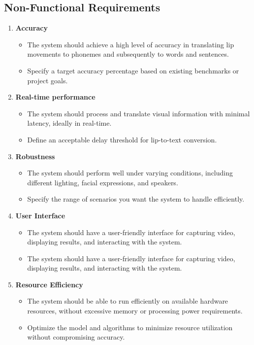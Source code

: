 \subsection{Non-Functional Requirements}
\begin{enumerate}
\item \textbf{Accuracy}
\begin{itemize}
\item The system should achieve a high level of accuracy in translating lip movements to phonemes and subsequently to words and sentences.  
\item Specify a target accuracy percentage based on existing benchmarks or project goals. 


\end{itemize}
\item \textbf{Real-time performance}
\begin{itemize}
\item The system should process and translate visual information with minimal latency, ideally in real-time.  
\item Define an acceptable delay threshold for lip-to-text conversion. 


\end{itemize}
\item \textbf{Robustness}
\begin{itemize}
\item The system should perform well under varying conditions, including different lighting, facial expressions, and speakers.   
\item Specify the range of scenarios you want the system to handle efficiently. 


\end{itemize}
\item \textbf{User Interface}
\begin{itemize}
\item The system should have a user-friendly interface for capturing video, displaying results, and interacting with the system.   
\item The system should have a user-friendly interface for capturing video, displaying results, and interacting with the system. 


\end{itemize}

\item \textbf{Resource Efficiency}
\begin{itemize}
\item The system should be able to run efficiently on available hardware resources, without excessive memory or processing power requirements.    
\item Optimize the model and algorithms to minimize resource utilization without compromising accuracy.


\end{itemize}

\end{enumerate}

